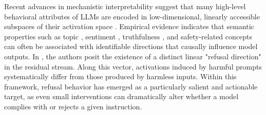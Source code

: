 \documentclass{article}
\theoremstyle{plain}
\theoremstyle{definition}
\theoremstyle{remark}
\begin{document}
Recent advances in mechanistic interpretability suggest that many high-level behavioral attributes of LLMs are encoded in low-dimensional, linearly accessible subspaces of their activation space \cite{mikolov2013linguistic,bolukbasi2016man,elhage2022toy,park2023linear}. Empirical evidence indicates that semantic properties such as topic \cite{turner2023steering}, sentiment \cite{tigges2023linear}, truthfulness \cite{li2023inference}, and safety-related concepts \cite{zheng2024prompt} can often be associated with identifiable directions that causally influence model outputs. In \cite{arditi2024refusal}, the authors posit the existence of a distinct linear "refusal direction" in the residual stream. Along this vector, activations induced by harmful prompts systematically differ from those produced by harmless inputs. Within this framework, refusal behavior has emerged as a particularly salient and actionable target, as even small interventions can dramatically alter whether a model complies with or rejects a given instruction. 



\end{document}
